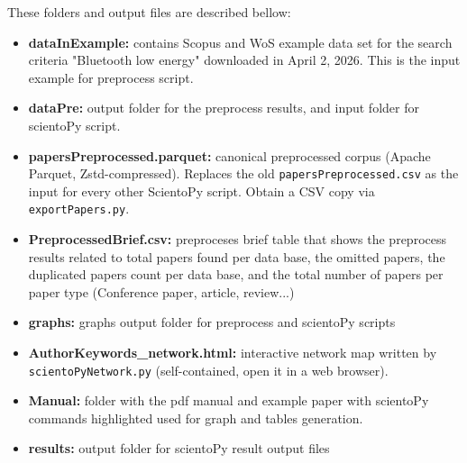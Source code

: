 \documentclass[10pt,letterpaper]{article}
\begin{document}
\vspace*{0.5cm}

These folders and output files are described bellow:

\begin{itemize}
	\item \textbf{dataInExample: } contains Scopus and WoS example data set for the search criteria "Bluetooth low energy" downloaded in April 2, 2026. This is the input example for preprocess script.

	\item \textbf{dataPre: } output folder for the preprocess results, and input folder for scientoPy script.

	\item \textbf{papersPreprocessed.parquet: } canonical preprocessed corpus (Apache Parquet, Zstd-compressed). Replaces the old \verb|papersPreprocessed.csv| as the input for every other ScientoPy script. Obtain a CSV copy via \verb|exportPapers.py|.
	
	\item \textbf{PreprocessedBrief.csv: } preproceses brief table that shows the preprocess results related to total papers found per data base, the omitted papers, the duplicated papers count per data base, and the total number of papers per paper type (Conference paper, article, review...)
	
	\item \textbf{graphs: } graphs output folder for preprocess and scientoPy scripts

	\item \textbf{AuthorKeywords\_network.html: } interactive network map written by \verb|scientoPyNetwork.py| (self-contained, open it in a web browser).
	
	\item \textbf{Manual: } folder with the pdf manual and example paper with scientoPy commands highlighted used for graph and tables generation. 
	
	\item \textbf{results: } output folder for scientoPy result output files
	

\end{itemize}
\end{document}
